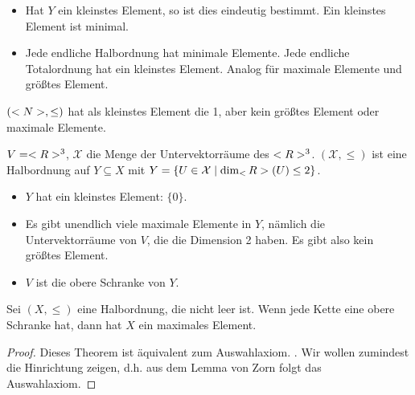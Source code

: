 \begin{remark}
	\begin{itemize}
		\item Hat $Y$ ein kleinstes Element, so ist dies eindeutig bestimmt. Ein kleinstes Element ist minimal.
		\item Jede endliche Halbordnung hat minimale Elemente. Jede endliche Totalordnung hat ein kleinstes Element. Analog für maximale Elemente und größtes Element.
	\end{itemize}
\end{remark}

\begin{example}
	$(<N>,\le)$ hat als kleinstes Element die 1, aber kein größtes Element oder maximale Elemente.
\end{example}

\begin{example}
	$V=<R>^3$, $\mathcal{X}$ die Menge der Untervektorräume des $<R>^3$. $(\mathcal{X},\le)$ ist eine Halbordnung auf $Y\subseteq X$ mit $Y=\{U\in\mathcal{X}\mid \dim_\real(U)\le 2\}$. 
	\begin{itemize}
		\item $Y$ hat ein kleinstes Element: $\{0\}$.
		\item Es gibt unendlich viele maximale Elemente in $Y$, nämlich die Untervektorräume von $V$, die die Dimension 2 haben. Es gibt also kein größtes Element.
		\item $V$ ist die obere Schranke von $Y$.
	\end{itemize}
\end{example}

\begin{theorem}
	Sei $(X,\le)$ eine Halbordnung, die nicht leer ist. Wenn jede Kette eine obere Schranke hat, dann hat $X$ ein maximales Element.
\end{theorem}
\begin{proof}
	Dieses Theorem ist äquivalent zum Auswahlaxiom. \frownie{}. Wir wollen zumindest die Hinrichtung zeigen, d.h. aus dem Lemma von Zorn folgt das Auswahlaxiom.
\end{proof}

